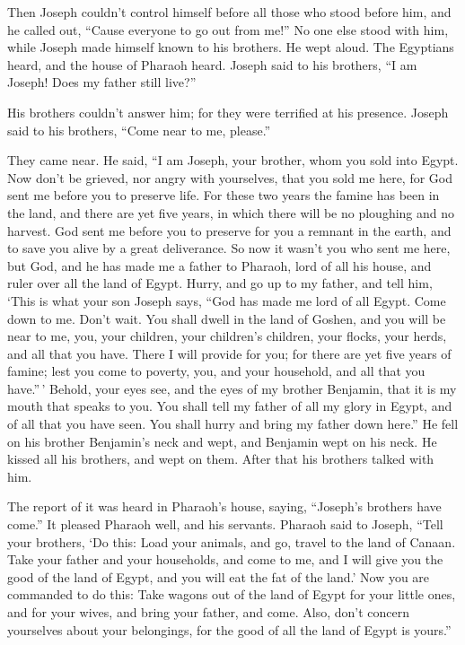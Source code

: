  Then Joseph couldn't control himself before all those who
stood before him, and he called out, ``Cause everyone to go out from
me!'' No one else stood with him, while Joseph made himself known to his
brothers.  He wept aloud. The Egyptians heard, and the house
of Pharaoh heard.  Joseph said to his brothers, ``I am
Joseph! Does my father still live?''

His brothers couldn't answer him; for they were terrified at his
presence.  Joseph said to his brothers, ``Come near to me,
please.''

They came near. He said, ``I am Joseph, your brother, whom you sold into
Egypt.  Now don't be grieved, nor angry with yourselves,
that you sold me here, for God sent me before you to preserve life.
 For these two years the famine has been in the land, and
there are yet five years, in which there will be no ploughing and no
harvest.  God sent me before you to preserve for you a
remnant in the earth, and to save you alive by a great deliverance.
 So now it wasn't you who sent me here, but God, and he has
made me a father to Pharaoh, lord of all his house, and ruler over all
the land of Egypt.  Hurry, and go up to my father, and tell
him, `This is what your son Joseph says, ``God has made me lord of all
Egypt. Come down to me. Don't wait.  You shall dwell in the
land of Goshen, and you will be near to me, you, your children, your
children's children, your flocks, your herds, and all that you have.
 There I will provide for you; for there are yet five years
of famine; lest you come to poverty, you, and your household, and all
that you have.''\,'  Behold, your eyes see, and the eyes of
my brother Benjamin, that it is my mouth that speaks to you.
 You shall tell my father of all my glory in Egypt, and of
all that you have seen. You shall hurry and bring my father down here.''
 He fell on his brother Benjamin's neck and wept, and
Benjamin wept on his neck.  He kissed all his brothers, and
wept on them. After that his brothers talked with him.

 The report of it was heard in Pharaoh's house, saying,
``Joseph's brothers have come.'' It pleased Pharaoh well, and his
servants.  Pharaoh said to Joseph, ``Tell your brothers,
`Do this: Load your animals, and go, travel to the land of Canaan.
 Take your father and your households, and come to me, and
I will give you the good of the land of Egypt, and you will eat the fat
of the land.'  Now you are commanded to do this: Take
wagons out of the land of Egypt for your little ones, and for your
wives, and bring your father, and come.  Also, don't
concern yourselves about your belongings, for the good of all the land
of Egypt is yours.''

